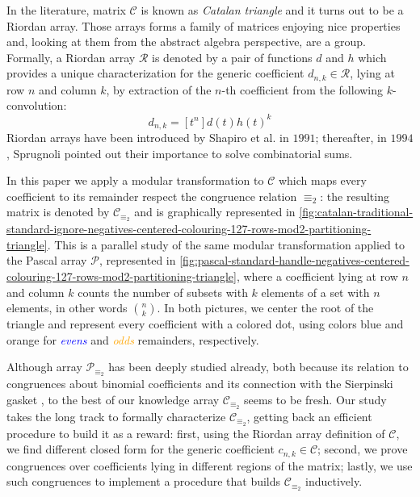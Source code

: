 In the literature, matrix $\mathcal{C}$ is known as \emph{Catalan triangle} and
it turns out to be a Riordan array. Those arrays forms a family of matrices enjoying
nice properties and, looking at them from the abstract algebra perspective, are a group. 
Formally, a Riordan array $\mathcal{R}$ is denoted by a pair of functions $d$ and $h$ which provides a unique 
characterization for the generic coefficient $d_{n,k}\in\mathcal{R}$, lying at row $n$ and column $k$, 
by extraction of the $n$-th coefficient from the following $k$-convolution:
\begin{equation}
    d_{n,k} = [t^{n}]d(t)h(t)^{k}
    \label{eq:Riordan:array:coefficient}
\end{equation}
Riordan arrays have been introduced by Shapiro et al. \cite{shapiro:1991} in $1991$;
thereafter, in $1994$, Sprugnoli \cite{sprugnoli:1991} pointed out their importance
to solve combinatorial sums.

In this paper we apply a modular transformation to $\mathcal{C}$ which maps every coefficient 
to its remainder respect the congruence relation $\equiv_{2}$: the resulting matrix is 
denoted by $\mathcal{C}_{\equiv_{2}}$ and is graphically represented in 
\autoref{fig:catalan-traditional-standard-ignore-negatives-centered-colouring-127-rows-mod2-partitioning-triangle}.
This is a parallel study of the same modular transformation applied to the Pascal array $\mathcal{P}$,
represented in \autoref{fig:pascal-standard-handle-negatives-centered-colouring-127-rows-mod2-partitioning-triangle},
where a coefficient lying at row $n$ and column $k$ counts the number of subsets
with $k$ elements of a set with $n$ elements, in other words ${{n}\choose{k}}$.
In both pictures, we center the root of the triangle and represent every coefficient 
with a colored dot, using colors blue and orange 
for \textcolor{blue}{\emph{evens}} and \textcolor{orange}{\emph{odds}} remainders, respectively. 

Although array $\mathcal{P}_{\equiv_{2}}$ has been deeply studied already, both because its 
relation to congruences about binomial coefficients and its connection with
the Sierpinski gasket \cite{stewart:four:encounters:sierpinski} \cite{sokolov},
to the best of our knowledge array $\mathcal{C}_{\equiv_{2}}$ seems to be fresh.  
Our study takes the long track to formally characterize $\mathcal{C}_{\equiv_{2}}$,
getting back an efficient procedure to build it as a reward: first,
using the Riordan array definition of $\mathcal{C}$, we find different closed form for
the generic coefficient $c_{n,k}\in\mathcal{C}$; second, we prove congruences over coefficients
lying in different regions of the matrix; lastly, we use such congruences to implement a procedure
that builds $\mathcal{C}_{\equiv_{2}}$ inductively. 

